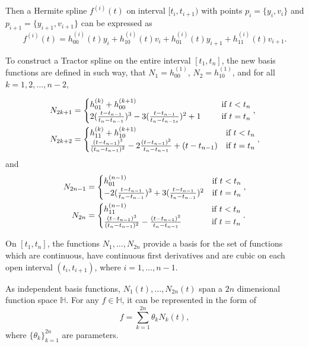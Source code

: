 Then a Hermite spline $f^{(i)}(t)$ on interval $[t_i,t_{i+1})$ with points $p_i=\{y_i,v_i\}$ and $p_{i+1}=\{y_{i+1},v_{i+1} \}$  can be expressed as
\begin{equation}
f^{(i)}(t)=h_{00}^{(i)}(t)y_i+h_{10}^{(i)}(t)v_i+h_{01}^{(i)}(t)y_{i+1} +h_{11}^{(i)}(t)v_{i+1}.
\end{equation}

To construct a Tractor spline on the entire interval $[t_1,t_n]$, the new basis functions are defined in such way, that $N_1 = h^{(1)}_{00}$, $N_2 = h^{(1)}_{10}$, and for all $k=1,2,\ldots,n-2$, 

\begin{align}
N_{2k+1}&=
\begin{cases}
h_{01}^{(k)}+h_{00}^{(k+1)} \hphantom{+(+t_{n}-t_{n-1}-t_{n})1.}  & \mbox{if $t<t_n$}\\
2(\frac{t-t_{n-1}}{t_{n}-t_{n-1}})^3-3(\frac{t-t_{n-1}}{t_{n}-t_{n-1s}})^2+1 &  \mbox{if $t=t_n$}
\end{cases},\\
N_{2k+2}&=
\begin{cases}
 h_{11}^{(k)}+h_{10}^{(k+1)} & \mbox{if $t<t_n$}\\
\frac{(t-t_{n-1})^3}{(t_{n}-t_{n-1})^2}-2\frac{(t-t_{n-1})^2}{t_{n}-t_{n-1}}+(t-t_{n-1}) & \mbox{if $t=t_n$}
\end{cases},
\end{align}
and
\begin{align}
N_{2n-1} &= 
\begin{cases}
h_{01}^{(n-1)} & \mbox{if $t<t_n$}\\ 
-2(\frac{t-t_{n-1}}{t_{n}-t_{n-1}})^3+3(\frac{t-t_{n-1}}{t_{n}-t_{n-1}})^2 & \mbox{if $t=t_n$}
\end{cases},\\
N_{2n} &= 
\begin{cases}
h_{11}^{(n-1)} & \mbox{if $t<t_n$}\\
\frac{(t-t_{n-1})^3}{(t_{n}-t_{n-1})^2}-\frac{(t-t_{n-1})^2}{t_{n}-t_{n-1}}  \hphantom{+t+.} & \mbox{if $t=t_n$}
\end{cases}.
\end{align}

\begin{theorem}\label{basisindependent}
On $[t_1,t_n]$, the functions $N_1,\ldots,N_{2n}$ provide a basis for the set of functions which are continuous, have continuous first derivatives and are 
cubic on each open interval $(t_i,t_{i+1})$, where $i=1, \ldots, n-1$.
\end{theorem}
As independent basis functions, $N_1(t), \ldots, N_{2n}(t)$ span a $2n$ dimensional function space $\mathbb{H}$. For any $f \in \mathbb{H}$, it can be represented in the form of
\begin{equation}
f=\sum_{k=1}^{2n} \theta_k N_k(t),
\end{equation}
where $\{\theta_k\}_{k=1}^{2n}$ are parameters.

